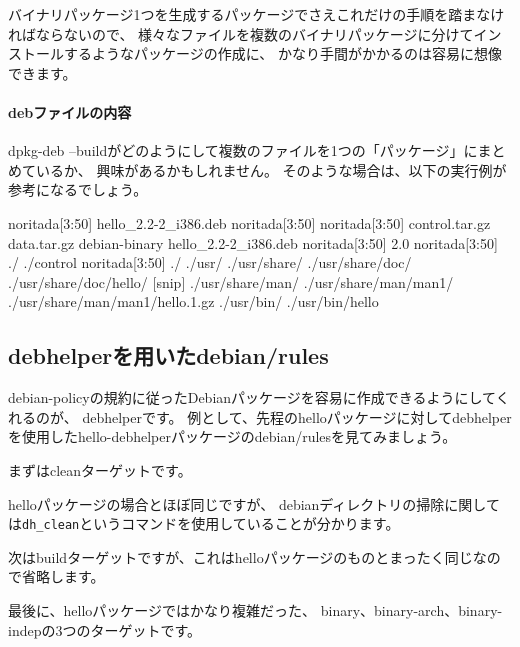 \documentclass[mingoth,a4paper]{jsarticle}
\begin{document}
バイナリパッケージ1つを生成するパッケージでさえこれだけの手順を踏まなければならないので、
様々なファイルを複数のバイナリパッケージに分けてインストールするようなパッケージの作成に、
かなり手間がかかるのは容易に想像できます。

\begin{screen}
\paragraph*{debファイルの内容}

dpkg-deb --buildがどのようにして複数のファイルを1つの「パッケージ」にまとめているか、
興味があるかもしれません。
そのような場合は、以下の実行例が参考になるでしょう。

\begin{commandline}
noritada[3:50]%
hello_2.2-2_i386.deb
noritada[3:50]%
noritada[3:50]%
control.tar.gz	data.tar.gz  debian-binary  hello_2.2-2_i386.deb
noritada[3:50]%
2.0
noritada[3:50]%
./
./control
noritada[3:50]%
./
./usr/
./usr/share/
./usr/share/doc/
./usr/share/doc/hello/
[snip]
./usr/share/man/
./usr/share/man/man1/
./usr/share/man/man1/hello.1.gz
./usr/bin/
./usr/bin/hello
\end{commandline}
\end{screen}

\subsection{debhelperを用いたdebian/rules}

debian-policyの規約に従ったDebianパッケージを容易に作成できるようにしてくれるのが、
debhelperです。
例として、先程のhelloパッケージに対してdebhelperを使用したhello-debhelperパッケージのdebian/rulesを見てみましょう。

まずはcleanターゲットです。


helloパッケージの場合とほぼ同じですが、
debianディレクトリの掃除に関しては\texttt{dh\_clean}というコマンドを使用していることが分かります。

次はbuildターゲットですが、これはhelloパッケージのものとまったく同じなので省略します。

最後に、helloパッケージではかなり複雑だった、
binary、binary-arch、binary-indepの3つのターゲットです。
\end{document}
